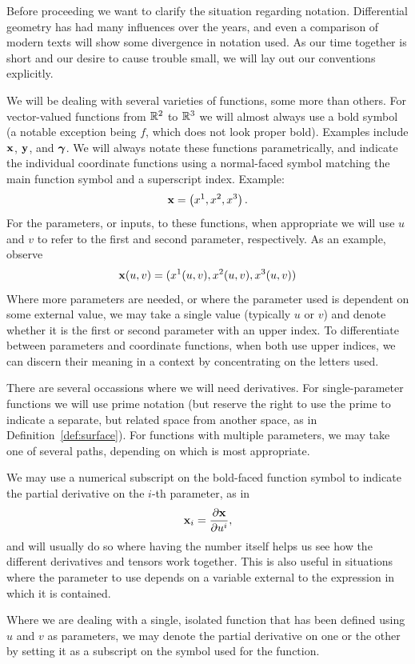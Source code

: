   \begin{unno_rem}
    Before proceeding we want to clarify the situation regarding notation. Differential geometry has had many influences over the years, and even a comparison of modern texts will show some divergence in notation used. As our time together is short and our desire to cause trouble small, we will lay out our conventions explicitly.

    We will be dealing with several varieties of functions, some more than others. For vector-valued functions from $\mathbb{R}^2$ to $\mathbb{R}^3$ we will almost always use a bold symbol (a notable exception being $f$, which does not look proper bold). Examples include $\mathbf{x}$, $\mathbf{y}$, and $\boldsymbol{\gamma}$. We will always notate these functions parametrically, and indicate the individual coordinate functions using a normal-faced symbol matching the main function symbol and a superscript index. Example:
    \[
      \mathbf{x} = \left(x^1, x^2, x^3\right).
    \]
    For the parameters, or inputs, to these functions, when appropriate we will use $u$ and $v$ to refer to the first and second parameter, respectively. As an example, observe
    \[
      \mathbf{x}(u, v) = (x^1(u, v), x^2(u, v), x^3(u, v))
    \]
    Where more parameters are needed, or where the parameter used is dependent on some external value, we may take a single value (typically $u$ or $v$) and denote whether it is the first or second parameter with an upper index. To differentiate between parameters and coordinate functions, when both use upper indices, we can discern their meaning in a context by concentrating on the letters used. 

    There are several occassions where we will need derivatives. For single-parameter functions we will use prime notation (but reserve the right to use the prime to indicate a separate, but related space from another space, as in Definition~\ref{def:surface}). For functions with multiple parameters, we may take one of several paths, depending on which is most appropriate.

    We may use a numerical subscript on the bold-faced function symbol to indicate the partial derivative on the $i$-th parameter, as in 
    \[
      \mathbf{x}_i = \frac{\partial \mathbf{x}}{\partial u^i},
    \]
    and will usually do so where having the number itself helps us see how the different derivatives and tensors work together. This is also useful in situations where the parameter to use depends on a variable external to the expression in which it is contained.

    Where we are dealing with a single, isolated function that has been defined using $u$ and $v$ as parameters, we may denote the partial derivative on one or the other by setting it as a subscript on the symbol used for the function.
  \end{unno_rem}

